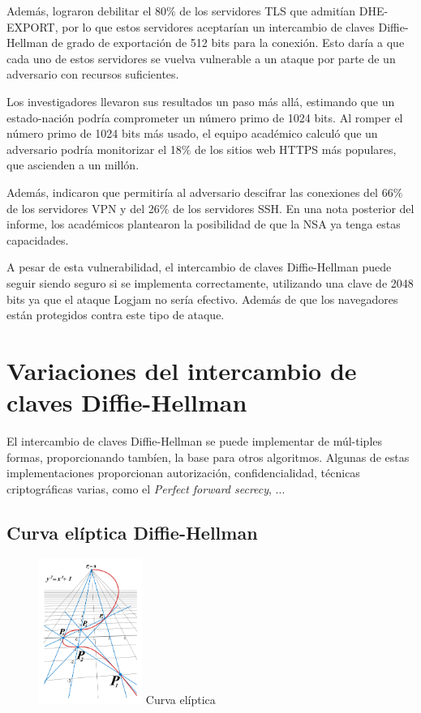 \documentclass[11pt]{article}
\begin{document}
Además, lograron debilitar el 80$\%$ de los servidores TLS que admitían DHE-EXPORT, por lo que estos servidores aceptarían un intercambio de claves Diffie-Hellman de grado de exportación de 512 bits para la conexión. Esto daría a que cada uno de estos servidores se vuelva vulnerable a un ataque por parte de un adversario con recursos suficientes.

Los investigadores llevaron sus resultados un paso más allá, estimando que un estado-nación podría comprometer un número primo de 1024 bits. Al romper el número primo de 1024 bits más usado, el equipo académico calculó que un adversario podría monitorizar el 18$\%$ de los sitios web HTTPS más populares, que ascienden a un millón.

Además, indicaron que permitiría al adversario descifrar las conexiones del 66$\%$ de los servidores VPN y del 26$\%$ de los servidores SSH. En una nota posterior del informe, los académicos plantearon la posibilidad de que la NSA ya tenga estas capacidades.

A pesar de esta vulnerabilidad, el intercambio de claves Diffie-Hellman puede seguir siendo seguro si se implementa correctamente, utilizando una clave de 2048 bits ya que el ataque Logjam no sería efectivo. Además de que los navegadores están protegidos contra este tipo de ataque.


\section{Variaciones del intercambio de claves Diffie-Hellman}

El intercambio de claves Diffie-Hellman se puede implementar de múl-tiples formas, proporcionando tambíen, la base para otros algoritmos. Algunas de estas implementaciones proporcionan autorización, confidencialidad, técnicas criptográficas varias, como el \emph{Perfect forward secrecy}, ...

\newpage

\subsection{Curva elíptica Diffie-Hellman}

\begin{figure} %
    \centering
    \includegraphics[width=0.30\textwidth]{img/curva.jpg}
   	Curva elíptica
\end{figure}
\end{document}
